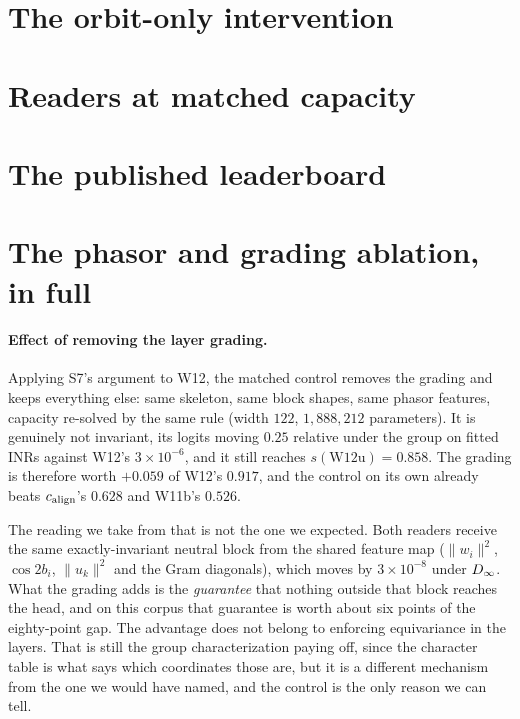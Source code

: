 \section{The orbit-only intervention}\label{app:orbit}



\section{Readers at matched capacity}\label{app:readers}



\section{The published leaderboard}\label{app:bench}





\section{The phasor and grading ablation, in full}\label{app:square}

\paragraph{Effect of removing the layer grading.} Applying S7's argument to W12,
the matched control removes the grading and keeps everything else: same skeleton, same block shapes,
same phasor features, capacity re-solved by the same rule (width $122$, $1{,}888{,}212$ parameters).
It is genuinely not invariant, its logits moving $0.25$ relative under the group on fitted INRs
against W12's $3\times10^{-6}$, and it still reaches $s(\mathrm{W12u}) = \mathbf{0.858}$. The
grading is therefore worth $+0.059$ of W12's $0.917$, and the control on its own already beats
$c_{\mathrm{align}}$'s $0.628$ and W11b's $0.526$.

The reading we take from that is not the one we expected. Both readers receive the same
exactly-invariant neutral block from the shared feature map ($\|w_i\|^2$, $\cos 2b_i$,
$\|u_k\|^2$ and the Gram diagonals), which moves by $3\times10^{-8}$ under $D_\infty$. What the grading
adds is the \emph{guarantee} that nothing outside that block reaches the head, and on this corpus
that guarantee is worth about six points of the eighty-point gap. The advantage does not belong to
enforcing equivariance in the layers. That is still the group characterization paying off, since the character
table is what says which coordinates those are, but it is a different mechanism from the one we
would have named, and the control is the only reason we can tell.

